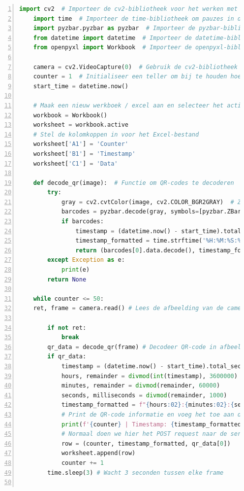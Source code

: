 \begin{lstlisting}[language=Python, caption={Python script voor experiment van QR-code camera.}, label=lst:huidigeQR-codeData, numbers=left]
    import cv2  # Importeer de cv2-bibliotheek voor het werken met beeldverwerking
    import time  # Importeer de time-bibliotheek om pauzes in de uitvoering van het programma te creëren
    import pyzbar.pyzbar as pyzbar  # Importeer de pyzbar-bibliotheek voor het decoderen van QR-codes
    from datetime import datetime  # Importeer de datetime-bibliotheek om tijdstempels te maken
    from openpyxl import Workbook  # Importeer de openpyxl-bibliotheek voor het werken met Excel-bestanden
    
    camera = cv2.VideoCapture(0)  # Gebruik de cv2-bibliotheek om toegang te krijgen tot de camera
    counter = 1  # Initialiseer een teller om bij te houden hoeveel QR-codes zijn gescand
    start_time = datetime.now()
    
    # Maak een nieuw werkboek / excel aan en selecteer het actieve werkblad
    workbook = Workbook()
    worksheet = workbook.active
    # Stel de kolomkoppen in voor het Excel-bestand
    worksheet['A1'] = 'Counter'
    worksheet['B1'] = 'Timestamp'
    worksheet['C1'] = 'Data'
    
    def decode_qr(image):  # Functie om QR-codes te decoderen
        try:
            gray = cv2.cvtColor(image, cv2.COLOR_BGR2GRAY)  # Zet het kleurenbeeld om in grijswaarden
            barcodes = pyzbar.decode(gray, symbols=[pyzbar.ZBarSymbol.QRCODE])  # Decodeer QR-codes
            if barcodes:
                timestamp = (datetime.now() - start_time).total_seconds()  # Bereken het tijdsverschil vanaf het begin
                timestamp_formatted = time.strftime('%H:%M:%S:%f', time.gmtime(timestamp))  # Maak de tijdstempel
                return (barcodes[0].data.decode(), timestamp_formatted)  # Return de gedecodeerde gegevens en tijdstempel
        except Exception as e:
            print(e)
        return None
    
    while counter <= 50:
    ret, frame = camera.read() # Lees de afbeelding van de camera
    
        if not ret:
            break
        qr_data = decode_qr(frame) # Decodeer QR-code in afbeelding
        if qr_data:
            timestamp = (datetime.now() - start_time).total_seconds() * 1000 # Formatteer de timestamp
            hours, remainder = divmod(int(timestamp), 3600000)
            minutes, remainder = divmod(remainder, 60000)
            seconds, milliseconds = divmod(remainder, 1000)
            timestamp_formatted = f"{hours:02}:{minutes:02}:{seconds:02}:{milliseconds:03}"
            # Print de QR-code informatie en voeg het toe aan de Excel-sheet
            print(f'{counter} | Timestamp: {timestamp_formatted} | Data: {qr_data[0]}')
            # Normaal doen we hier het POST request naar de server zie originele code
            row = (counter, timestamp_formatted, qr_data[0])
            worksheet.append(row)
            counter += 1
        time.sleep(3) # Wacht 3 seconden tussen elke frame
    

\end{lstlisting}
